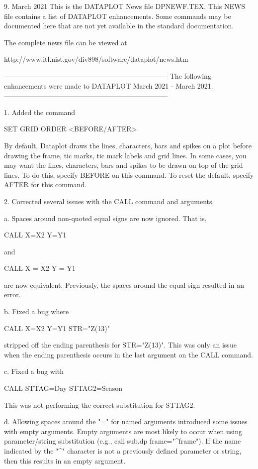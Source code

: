 9.
                                                     March   2021
This is the DATAPLOT News file DPNEWF.TEX.  This NEWS file contains a
list of DATAPLOT enhancements.  Some commands may be documented here
that are not yet available in the standard documentation.

The complete news file can be viewed at

    http://www.itl.nist.gov/div898/software/dataplot/news.htm

-----------------------------------------------------------------------
The following enhancements were made to DATAPLOT
March 2021 - March 2021.
-----------------------------------------------------------------------

 1. Added the command

      SET GRID ORDER <BEFORE/AFTER>

    By default, Dataplot draws the lines, characters, bars and
    spikes on a plot before drawing the frame, tic marks, tic mark
    labels and grid lines.  In some cases, you may want the lines,
    characters, bars and spikes to be drawn on top of the grid lines.
    To do this, specify BEFORE on this command.  To reset the default,
    specify AFTER for this command.

 2. Corrected several issues with the CALL command and arguments.

    a. Spaces around non-quoted equal signs are now ignored.  That is,

           CALL X=X2 Y=Y1

        and

           CALL X = X2 Y = Y1

        are now equivalent.  Previously, the spaces around the equal
        sign resulted in an error.

    b. Fixed a bug where

           CALL X=X2 Y=Y1 STR="Z(13)"

       stripped off the ending parenthesis for STR="Z(13)".  This was
       only an issue when the ending parenthesis occurs in the last
       argument on the CALL command.

    c. Fixed a bug with

           CALL STTAG=Day STTAG2=Season

        This was not performing the correct substitution for STTAG2.

     d. Allowing spaces around the "=" for named arguments introduced
        some issues with empty arguments.  Empty arguments are most
        likely to occur when using parameter/string substitution
        (e.g., call sub.dp frame="^frame").  If the name indicated by
        the "^" character is not a previously defined parameter or
        string, then this results in an empty argument.

